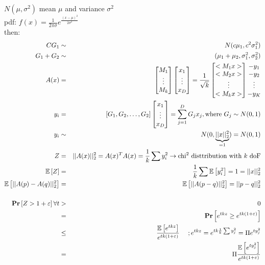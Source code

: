 \documentclass[12pt]{article}
\newcommand{\forceindent}{\leavevmode{\parindent=1.3em\indent}}
\begin{document}
\begin{enumerate}[align=left, labelwidth=1ex, start=1,label={Lemma \arabic*}]
	$N(\mu, \sigma^2)$ mean $\mu$ and variance $\sigma^2$\\
	pdf: $f(x) = \frac{1}{2\pi\sigma}e^{\frac{(x-\mu)^2}{2\sigma^2}}$\\
	then:
	\begin{eqnarray*}
	CG_1&\sim& N(c\mu_1, c^2\sigma_1^2) \\
	G_1 + G_2 &\sim& (\mu_1+\mu_2, \sigma_1^2, \sigma_2^2)\\
	A(x)&=&\left[
	\begin{matrix}
		M_1\\
		\vdots\\
		M_k
	\end{matrix}
	\right]
	\left[
	\begin{matrix}
		x_1\\
		\vdots
		\\
		x_D
	\end{matrix}
	\right] = \frac{1}{\sqrt{k}}
	\left[
	\begin{matrix}
		<M_1x>\\
		<M_2x>\\
		\vdots
		\\
		<M_kx>
	\end{matrix}
	\right]
	\begin{matrix}
		-y_1\\
		-y_2\\
		\vdots
		\\
		-y_K
	\end{matrix}\\
	y_i &=& \left[G_1, G_2,\dots, G_2\right]
	\left[ \begin{matrix}
		x_1\\
		\vdots
		\\
		x_D
	\end{matrix}
	\right]
	= \sum^D_{j=1}G_jx_j, \text{where $G_j \sim N(0,1)$}\\
	y_i &\sim& N(0, \underbrace{||x||^2_2}_{=1}) = N(0,1)\\
	Z &=& ||A(x)||^2_2 = A(x)^TA(x) = \frac{1}{k} \sum y_i^2 \to \text{chi$^2$ disttribution with $k$ doF}\\
	\mathbb{E}\left[Z\right] &=& \frac{1}{k}\sum \mathbb{E}\left[y_i^2\right] =1 = ||x||_2^2\\
	\mathbb{E}\left[||A(p)-A(q)||_2^2\right] &=& \mathbb{E}\left[||A(p-q)||_2^2\right] = ||p-q||_2^2\\\\
	\Pr\left[Z > 1+\varepsilon \right] \forall t&>&0\\
	&=& \Pr\left[e^{tkz} \geq e^{tk(1+\varepsilon)}\right]\\
	&\leq& \frac{\mathbb{E}\left[e^{tkz}\right]}{e^{tk(1+\varepsilon)}} \forceindent ;e^{tkz} = e^{tk\frac{1}{k}\sum y_j^2} = \Pi e^{ty_j^2}\\
	&=& \Pi \frac{\mathbb{E}\left[e^{ty_j^2}\right]}{e^{tk(1+\varepsilon)}}
	\end{eqnarray*}


\end{enumerate}
\end{document}
